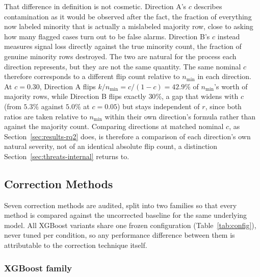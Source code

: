 That difference in definition is not cosmetic. Direction A's $c$ describes
contamination as it would be observed after the fact, the fraction of
everything now labeled minority that is actually a mislabeled majority row,
close to asking how many flagged cases turn out to be false alarms.
Direction B's $c$ instead measures signal loss directly against the true
minority count, the fraction of genuine minority rows destroyed. The two are
natural for the process each direction represents, but they are not the
same quantity. The same nominal $c$ therefore corresponds to a different
flip count relative to $n_{\min}$ in each direction. At $c{=}0.30$,
Direction A flips $k/n_{\min} = c/(1-c) = 42.9\%$ of $n_{\min}$'s worth of
majority rows, while Direction B flips exactly $30\%$, a gap that widens
with $c$ (from $5.3\%$ against $5.0\%$ at $c{=}0.05$) but stays independent
of $r$, since both ratios are taken relative to $n_{\min}$ within their own
direction's formula rather than against the majority count. Comparing
directions at matched nominal $c$, as Section~\ref{sec:results-rq2} does,
is therefore a comparison of each direction's own natural severity, not of
an identical absolute flip count, a distinction
Section~\ref{sec:threats-internal} returns to.

\subsection{Correction Methods}
\label{sec:methods-corrections}

Seven correction methods are audited, split into two families so that every
method is compared against the uncorrected baseline for the same underlying
model. All XGBoost variants share one frozen configuration
(Table~\ref{tab:config}), never tuned per condition, so any performance
difference between them is attributable to the correction technique itself.

\subsubsection{XGBoost family}

